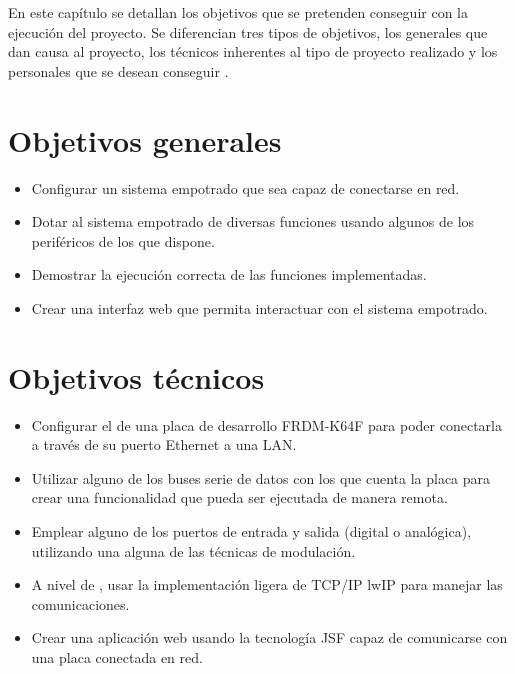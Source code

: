 \label{ch:objetivos}

En este capítulo se detallan los objetivos que se pretenden conseguir con la
ejecución del proyecto. Se diferencian tres tipos de objetivos, los generales
que dan causa al proyecto, los técnicos inherentes al tipo de proyecto realizado
y los personales que se desean conseguir .

\section{Objetivos generales}\label{sec:obj_generales}
\begin{itemize}
  \item Configurar un sistema empotrado que sea capaz de conectarse en red.
  \item Dotar al sistema empotrado de diversas funciones usando algunos de los
  periféricos de los que dispone.
  \item Demostrar la ejecución correcta de las funciones implementadas.
  \item Crear una interfaz web que permita interactuar con el sistema empotrado.
\end{itemize}

\section{Objetivos técnicos}\label{sec:obj_tecnicos}
\begin{itemize}
  \item Configurar el  de una placa de desarrollo
  FRDM-K64F para poder conectarla a través de su puerto Ethernet a una LAN.
  \item Utilizar alguno de los buses serie de datos con los que cuenta la placa
  para crear una funcionalidad que pueda ser ejecutada de manera remota.
  \item Emplear alguno de los puertos de entrada y salida (digital o analógica),
  utilizando una alguna de las técnicas de modulación.
  \item A nivel de , usar la implementación ligera de 
  TCP/IP lwIP para manejar las comunicaciones.
  \item Crear una aplicación web usando la tecnología JSF capaz de comunicarse
  con una placa conectada en red.
\end{itemize}

